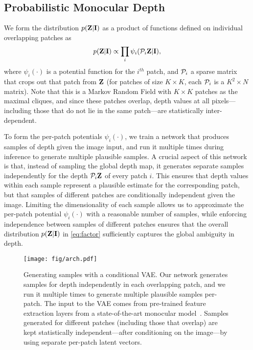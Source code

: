 \documentclass[10pt,twocolumn,letterpaper]{article}
\begin{document}
\subsection{Probabilistic Monocular Depth}

We form the distribution $p(\mathbf{Z}|\mathbf{I})$ as a product of functions defined on individual overlapping patches as
\begin{equation}
  \label{eq:factor}
  p(\mathbf{Z}|\mathbf{I}) \propto \prod_i \psi_i(\mathcal{P}_i{}\mathbf{Z} | \mathbf{I}),
\end{equation}
where $\psi_i(\cdot)$ is a potential function for the $i^{th}$ patch, and $\mathcal{P}_i{}$ a sparse matrix that crops out that patch from $\mathbf{Z}$ (for patches of size $K\times K$, each $\mathcal{P}_i{}$ is a $K^2\times N$ matrix). Note that this is a Markov Random Field with $K\times K$ patches as the maximal cliques, and since these patches overlap, depth values at all pixels---including those that do not lie in the same patch---are statistically inter-dependent.

 To form the per-patch potentials $\psi_i(\cdot)$, we train a network that produces samples of depth given the image input, and run it multiple times during inference to generate multiple plausible samples. A crucial aspect of this network is that, instead of  sampling the global depth map, it generates separate samples independently for the depth $\mathcal{P}_i{}\mathbf{Z}$ of every patch $i$. This ensures that depth values within each sample represent a plausible estimate for the corresponding patch, but that samples of different patches are conditionally independent given the image. Limiting the dimensionality of each sample allows us to approximate the per-patch potential $\psi_i(\cdot)$ with a reasonable number of samples, while enforcing independence between samples of different patches ensures that the overall distribution $p(\mathbf{Z}|\mathbf{I})$ in \eqref{eq:factor} sufficiently captures the global ambiguity in depth.\begin{figure}[!t]
  \begin{center}
    \texttt{[image: fig/arch.pdf]}
  \end{center}
  \caption{Generating samples with a conditional VAE. Our network generates samples for depth independently in each overlapping patch, and we run it multiple times to generate multiple plausible samples per-patch. The input to the VAE comes from pre-trained feature extraction layers from a state-of-the-art monocular model~\cite{fu2018deep}. Samples generated for different patches (including those that overlap) are kept statistically independent---after conditioning on the image---by using separate per-patch latent vectors.}
  \label{fig:arch}
\end{figure}
\end{document}
